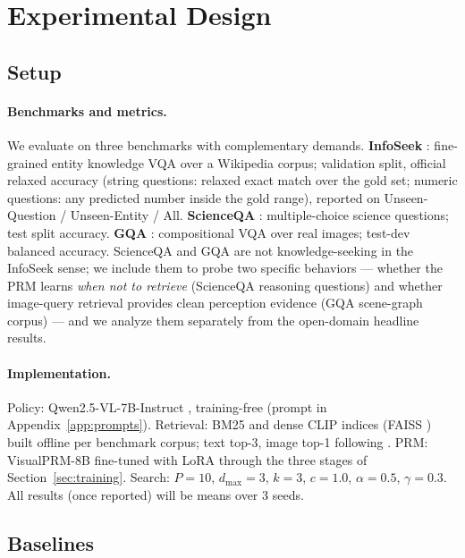 \documentclass[letterpaper,twocolumn,10pt]{article}
\begin{document}
\section{Experimental Design}
\label{sec:experiments}

\subsection{Setup}
\label{sec:setup}

\paragraph{Benchmarks and metrics.}
We evaluate on three benchmarks with complementary demands.
\textbf{InfoSeek} \cite{chen2023infoseek}: fine-grained entity knowledge
VQA over a Wikipedia corpus; validation split, official relaxed accuracy
(string questions: relaxed exact match over the gold set; numeric
questions: any predicted number inside the gold range), reported on
Unseen-Question / Unseen-Entity / All. \textbf{ScienceQA}
\cite{lu2022scienceqa}: multiple-choice science questions; test split
accuracy. \textbf{GQA} \cite{hudson2019gqa}: compositional VQA over real
images; test-dev balanced accuracy. ScienceQA and GQA are not
knowledge-seeking in the InfoSeek sense; we include them to probe two
specific behaviors --- whether the PRM learns \emph{when not to retrieve}
(ScienceQA reasoning questions) and whether image-query retrieval provides
clean perception evidence (GQA scene-graph corpus) --- and we analyze them
separately from the open-domain headline results.

\paragraph{Implementation.}
Policy: Qwen2.5-VL-7B-Instruct \cite{bai2025qwen25vl}, training-free
(prompt in Appendix~\ref{app:prompts}). Retrieval: BM25
\cite{robertson2009bm25} and dense CLIP indices (FAISS
\cite{johnson2019faiss}) built offline per benchmark corpus; text top-3,
image top-1 following \citet{chen2026learningtosearch}. PRM: VisualPRM-8B
fine-tuned with LoRA \cite{hu2022lora} through the three stages of
Section~\ref{sec:training}. Search: $P{=}10$, $d_{\max}{=}3$, $k{=}3$,
$c{=}1.0$, $\alpha{=}0.5$, $\gamma{=}0.3$. All results (once reported)
will be means over 3 seeds.

\subsection{Baselines}
\label{sec:baselines}
\end{document}
